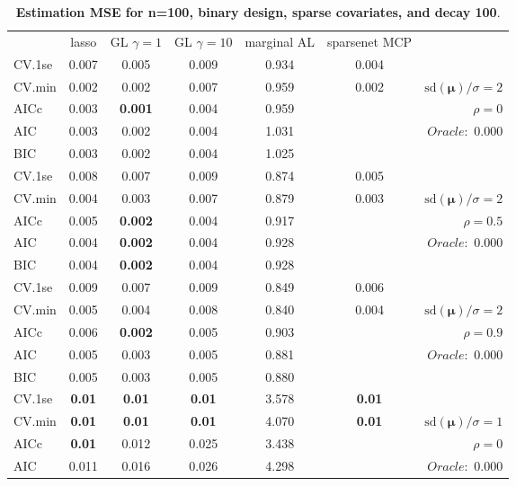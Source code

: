 \clearpage
\begin{table}\vspace{-.5cm}
\caption[l]{ { \bf Estimation MSE for n=100, binary design, 
sparse covariates, and  decay  100}.}
\vspace{-.5cm}
\footnotesize{}
\begin{center}
\begin{tabular}{l*{5}{c}|r}
& lasso & GL $\gamma=1$ & GL $\gamma=10$ & marginal AL & sparsenet MCP  & \\
 \cline{1-7}
CV.1se & 0.007 & 0.005 & 0.009 & 0.934 & 0.004 & \\
CV.min & 0.002 & 0.002 & 0.007 & 0.959 & 0.002 &  $\mathrm{sd}(\mathbf{\mu})/\sigma=2$ \\
AICc & 0.003 & {\bf 0.001} & 0.004 & 0.959 & & $\rho=0$ \\
AIC & 0.003 & 0.002 & 0.004 & 1.031 & &  \multirow{2}{*}{$Oracle: $ 0.000} \\
BIC & 0.003 & 0.002 & 0.004 & 1.025 & &  \\
 \hline 
CV.1se & 0.008 & 0.007 & 0.009 & 0.874 & 0.005 & \\
CV.min & 0.004 & 0.003 & 0.007 & 0.879 & 0.003 &  $\mathrm{sd}(\mathbf{\mu})/\sigma=2$ \\
AICc & 0.005 & {\bf 0.002} & 0.004 & 0.917 & & $\rho=0.5$ \\
AIC & 0.004 & {\bf 0.002} & 0.004 & 0.928 & &  \multirow{2}{*}{$Oracle: $ 0.000} \\
BIC & 0.004 & {\bf 0.002} & 0.004 & 0.928 & &  \\
 \hline 
CV.1se & 0.009 & 0.007 & 0.009 & 0.849 & 0.006 & \\
CV.min & 0.005 & 0.004 & 0.008 & 0.840 & 0.004 &  $\mathrm{sd}(\mathbf{\mu})/\sigma=2$ \\
AICc & 0.006 & {\bf 0.002} & 0.005 & 0.903 & & $\rho=0.9$ \\
AIC & 0.005 & 0.003 & 0.005 & 0.881 & &  \multirow{2}{*}{$Oracle: $ 0.000} \\
BIC & 0.005 & 0.003 & 0.005 & 0.880 & &  \\
 \hline 
CV.1se & {\bf 0.01} & {\bf 0.01} & {\bf 0.01} & 3.578 & {\bf 0.01} & \\
CV.min & {\bf 0.01} & {\bf 0.01} & {\bf 0.01} & 4.070 & {\bf 0.01} &  $\mathrm{sd}(\mathbf{\mu})/\sigma=1$ \\
AICc & {\bf 0.01} & 0.012 & 0.025 & 3.438 & & $\rho=0$ \\
AIC & 0.011 & 0.016 & 0.026 & 4.298 & &  \multirow{2}{*}{$Oracle: $ 0.000} \\

\end{tabular}
\end{center}
\end{table}
